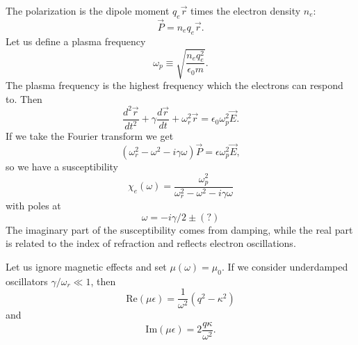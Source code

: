 The polarization is the dipole moment $q_e\vec r$ times the electron density $n_e$:
\begin{equation}
    \vec P = n_e q_e \vec r.
\end{equation}
Let us define a plasma frequency
\begin{equation}
    \omega_p \equiv \sqrt{\frac{n_e q_e^2}{\epsilon_0 m}}.
\end{equation}
The plasma frequency is the highest frequency which the electrons can respond to.
Then
\begin{equation}
    \frac{d^2\vec r}{dt^2} + \gamma \frac{d\vec r}{dt} + \omega_r^2 \vec r = \epsilon_0 \omega_p^2 \vec E.
\end{equation}
If we take the Fourier transform we get
\begin{equation}
    (\omega_r^2 -\omega^2 -i\gamma \omega)\vec P = \epsilon \omega_p^2 \vec E,
\end{equation}
so we have a susceptibility
\begin{equation}
    \chi_e (\omega) = \frac{\omega_p^2}{\omega_r^2 -\omega^2 -i\gamma \omega}
\end{equation}
with poles at
\begin{equation}
    \omega = -i\gamma/2\pm (?)
\end{equation}
The imaginary part of the susceptibility comes from damping, while the real part is related to the index of refraction and reflects electron oscillations.

Let us ignore magnetic effects and set $\mu(\omega)=\mu_0$. If we consider underdamped oscillators $\gamma/\omega_r \ll 1$, then
\begin{equation}
    \text{Re}(\mu \epsilon) = \frac{1}{\omega^2}(q^2-\kappa^2)
\end{equation}
and
\begin{equation}
    \text{Im}(\mu\epsilon) = 2 \frac{q\kappa}{\omega^2}.
\end{equation}%